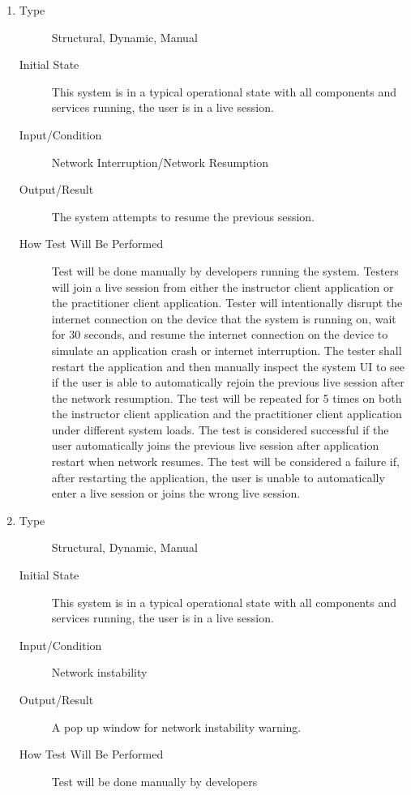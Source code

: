 \documentclass[12pt, titlepage]{article}
\begin{document}
\begin{enumerate}[NFR-T1]
\begin{description}
  \end{description}
\item \label{NFRT7}
  \begin{description}
  \item[Type] Structural, Dynamic, Manual
  \item[Initial State] This system is in a typical operational state with all
    components and services running, the user is in a live session.
  \item[Input/Condition] Network Interruption/Network Resumption
  \item[Output/Result] The system attempts to resume the previous session.
  \item[How Test Will Be Performed] Test will be done manually by developers
    running the system. Testers will join a live session from either the
    instructor client application or the practitioner client application. Tester
    will intentionally disrupt the internet connection on the device that the
    system is running on, wait for 30 seconds, and resume the internet
    connection on the device to simulate an application crash or internet
    interruption. The tester shall restart the application and then manually
    inspect the system UI to see if the user is able to automatically rejoin the
    previous live session after the network resumption. The test will be
    repeated for 5 times on both the instructor client application and the
    practitioner client application under different system loads. The test is
    considered successful if the user automatically joins the previous live
    session after application restart when network resumes. The test will be
    considered a failure if, after restarting the application, the user is
    unable to automatically enter a live session or joins the wrong live
    session.
  \end{description}
\item \label{NFRT8}
  \begin{description}
  \item[Type] Structural, Dynamic, Manual
  \item[Initial State] This system is in a typical operational state with all
    components and services running, the user is in a live session.
  \item[Input/Condition] Network instability
  \item[Output/Result] A pop up window for network instability warning.
  \item[How Test Will Be Performed] Test will be done manually by developers

\end{description}
\end{enumerate}
\end{document}
